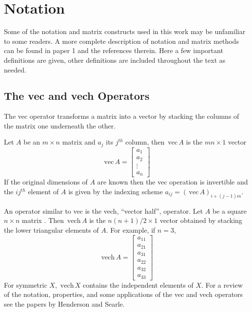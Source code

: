 \documentclass[12pt,thmsa]{article}
\begin{document}
\section{Notation}

Some of the notation and matrix constructs used in this work may be
unfamiliar to some readers. A more complete description of notation and
matrix methods can be found in paper 1 and the references therein. Here a
few important definitions are given, other definitions are included
throughout the text as needed.

\subsection{The vec and vech Operators}

The vec operator transforms a matrix into a vector by stacking the columns
of the matrix one underneath the other.

Let $A$ be an $m\times n$ matrix and $a_j$ its $j^{th}$ column, then $\,%
\mathrm{vec}\,A$ is the $mn\times 1$ vector 
\begin{equation}
\,\mathrm{vec}\,A=\left[ 
\begin{array}{c}
a_1 \\ 
a_2 \\ 
\vdots \\ 
a_n
\end{array}
\right]
\end{equation}
If the original dimensions of $A$ are known then the vec operation is
invertible and the $ij^{th}$ element of $A$ is given by the indexing scheme $%
a_{ij}=\left( \,\mathrm{vec}\,A\right) _{i+\left( j-1\right) m}$.

An operator similar to vec is the vech, ``vector half'', operator. Let $A$
be a square $n\times n$ matrix . Then $\,\mathrm{vech}\,A$ is the $n\left(
n+1\right) /2\times 1$ vector obtained by stacking the lower triangular
elements of $A$. For example, if $n=3$, 
\begin{equation}
\,\mathrm{vech}\,A=\left[ 
\begin{array}{c}
a_{11} \\ 
a_{21} \\ 
a_{31} \\ 
a_{22} \\ 
a_{32} \\ 
a_{33}
\end{array}
\right]
\end{equation}
For symmetric $X$, $\,\mathrm{vech}\,X$ contains the independent elements of 
$X$. For a review of the notation, properties, and some applications of the
vec and vech operators see the papers by Henderson and Searle\cite
{HendersonSearle79,HendersonSearle80}.
\end{document}
